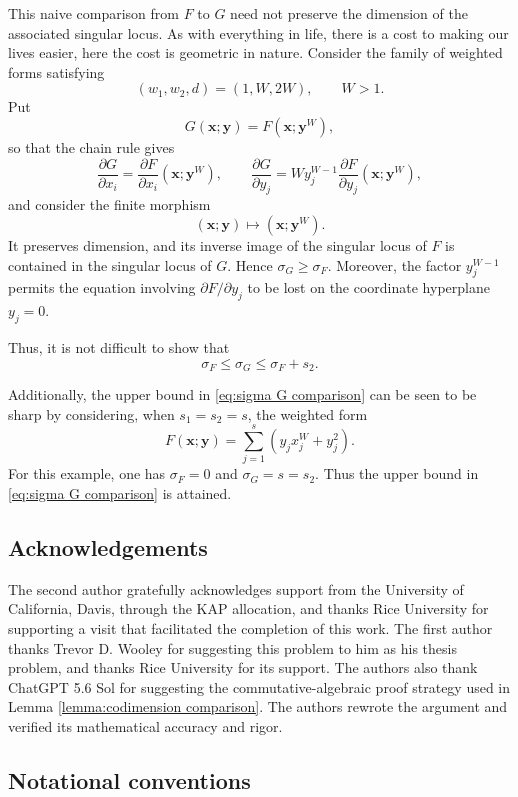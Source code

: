 \documentclass[12pt,reqno]{amsart}
\theoremstyle{definition}
\theoremstyle{remark}
\numberwithin{equation}{section}
\def\bfx{{\mathbf x}}
\def\bfy{{\mathbf y}}
\begin{document}
This naive comparison from $F$ to $G$ need not preserve the dimension of the 
associated singular locus. As with everything in life, there is a cost to making
 our lives easier, here the cost is geometric in nature. Consider the family of 
 weighted forms satisfying
\[
    (w_1,w_2,d)=(1,W,2W),
    \qquad W>1.
\]
Put
\[
    G(\bfx;\bfy)=F(\bfx;\bfy^W),
\]
so that the chain rule gives
\[
\frac{\partial G}{\partial x_i}
=\frac{\partial F}{\partial x_i}(\bfx;\bfy^W),
\qquad
\frac{\partial G}{\partial y_j}
=W y_j^{W-1}
\frac{\partial F}{\partial y_j}(\bfx;\bfy^W),
\]
and consider the finite morphism
\[
    (\bfx;\bfy)\longmapsto(\bfx;\bfy^W).
\]
It preserves dimension, and its inverse image of the singular locus of $F$ is
contained in the singular locus of $G$.  Hence $\sigma_G\geq\sigma_F$.
Moreover, the factor $y_j^{W-1}$ permits the equation involving
$\partial F/\partial y_j$ to be lost on the coordinate hyperplane $y_j=0$.

Thus, it is not difficult to show that
\begin{equation}\label{eq:sigma G comparison}
    \sigma_F\leq\sigma_G\leq\sigma_F+s_2.
\end{equation}

Additionally, the upper bound in \eqref{eq:sigma G comparison} can be seen to be sharp by
considering, when $s_1=s_2=s$, the weighted form
\[
    F(\bfx;\bfy)=
    \sum_{j=1}^{s}\left(y_jx_j^W+y_j^2\right).
\]
For this example, one has $\sigma_F=0$ and $\sigma_G=s=s_2$.  Thus the
upper bound in \eqref{eq:sigma G comparison} is attained.

\subsection*{Acknowledgements}
The second author gratefully acknowledges support from the University of
California, Davis, through the KAP allocation, and thanks Rice University for supporting 
a visit that facilitated the completion of this work. The first author thanks Trevor
D. Wooley for suggesting this problem to him as his thesis problem, and thanks Rice 
University for its support. The authors also thank ChatGPT 5.6 Sol for suggesting 
the commutative-algebraic proof strategy used in Lemma \ref{lemma:codimension comparison}.
 The authors rewrote the argument and verified its mathematical accuracy 
 and rigor.

\subsection{Notational conventions}\label{subsec:notational conventions}
\end{document}
